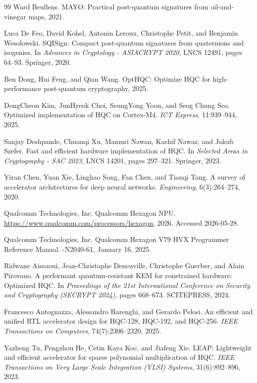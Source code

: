 \documentclass[12pt,a4paper]{report}
\begin{document}
\begin{thebibliography}{99}
Ward Beullens.
\newblock MAYO: Practical post-quantum signatures from oil-and-vinegar maps, 2021.

Luca De Feo, David Kohel, Antonin Leroux, Christophe Petit, and Benjamin Wesolowski.
\newblock SQISign: Compact post-quantum signatures from quaternions and isogenies.
\newblock In \emph{Advances in Cryptology - ASIACRYPT 2020}, LNCS 12491, pages 64--93. Springer, 2020.

Ben Dong, Hui Feng, and Qian Wang.
\newblock OptHQC: Optimize HQC for high-performance post-quantum cryptography, 2025.

DongCheon Kim, JunHyeok Choi, SeungYong Yoon, and Seog Chung Seo.
\newblock Optimized implementation of HQC on Cortex-M4.
\newblock \emph{ICT Express}, 11:939--944, 2025.

Sanjay Deshpande, Chuanqi Xu, Mamuri Nawan, Kashif Nawaz, and Jakub Szefer.
\newblock Fast and efficient hardware implementation of HQC.
\newblock In \emph{Selected Areas in Cryptography - SAC 2023}, LNCS 14201, pages 297--321. Springer, 2023.

Yiran Chen, Yuan Xie, Linghao Song, Fan Chen, and Tianqi Tang.
\newblock A survey of accelerator architectures for deep neural networks.
\newblock \emph{Engineering}, 6(3):264--274, 2020.

Qualcomm Technologies, Inc.
\newblock Qualcomm Hexagon NPU.
\newblock \url{https://www.qualcomm.com/processors/hexagon}, 2026. Accessed 2026-05-28.

Qualcomm Technologies, Inc.
\newblock Qualcomm Hexagon V79 HVX Programmer Reference Manual.
-N2040-61, January 16, 2025.

Ridwane Aissaoui, Jean-Christophe Deneuville, Christophe Guerber, and Alain Pirovano.
\newblock A performant quantum-resistant KEM for constrained hardware: Optimized HQC.
\newblock In \emph{Proceedings of the 21st International Conference on Security and Cryptography (SECRYPT 2024)}, pages 668--673. SCITEPRESS, 2024.

Francesco Antognazza, Alessandro Barenghi, and Gerardo Pelosi.
\newblock An efficient and unified RTL accelerator design for HQC-128, HQC-192, and HQC-256.
\newblock \emph{IEEE Transactions on Computers}, 74(7):2306--2320, 2025.

Yazheng Tu, Pengzhou He, Cetin Kaya Koc, and Jiafeng Xie.
\newblock LEAP: Lightweight and efficient accelerator for sparse polynomial multiplication of HQC.
\newblock \emph{IEEE Transactions on Very Large Scale Integration (VLSI) Systems}, 31(6):892--896, 2023.


\end{thebibliography}
\end{document}
